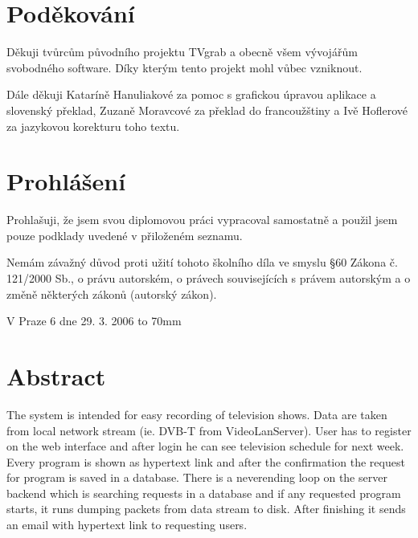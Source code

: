 \documentclass[11pt,twoside,a4paper]{dp_format}%
\begin{document}
\coverpagestarts
\vspace*{\fill}

\cleardoublepage %

\vspace*{\fill}
\chapter*{Poděkování}
Děkuji tvůrcům původního projektu TVgrab a obecně všem vývojářům svobodného software. Díky kterým tento projekt mohl vůbec vzniknout.

Dále děkuji Kataríně Hanuliakové za pomoc s grafickou úpravou aplikace a slovenský překlad, Zuzaně Moravcové za překlad do francoužštiny a Ivě Hoflerové za jazykovou korekturu toho textu.

\cleardoublepage %

\vspace*{\fill}
\chapter*{Prohlášení}
Prohlašuji, že jsem svou diplomovou práci vypracoval samostatně a použil jsem pouze podklady uvedené v přiloženém seznamu.

Nemám závažný důvod proti užití tohoto školního díla ve smyslu \S 60 Zákona č. 121/2000 Sb., o právu autorském, o právech souvisejících s právem autorským a o změně některých zákonů (autorský zákon).

V Praze 6 dne 29. 3. 2006  \hfill \hbox to 70mm{\tiny\dotfill}
 
\cleardoublepage%

\chapter*{Abstract}
The system is intended for easy recording of television shows. Data are taken from local network stream (ie. DVB-T from VideoLanServer). User has to register on the web interface and after login he can see television schedule for next week. Every program is shown as hypertext link and after the confirmation the request for program is saved in a database. There is a neverending loop on the server backend which is searching requests in a database and if any requested program starts, it runs dumping packets from data stream to disk. After finishing it sends an email with hypertext link to requesting users.
\end{document}
